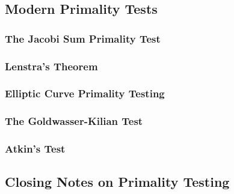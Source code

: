 \documentclass{article}
\begin{document}

\subsection{Modern Primality Tests}


\subsubsection{The Jacobi Sum Primality Test}

\subsubsection{Lenstra's Theorem}

\subsubsection{Elliptic Curve Primality Testing}

\subsubsection{The Goldwasser-Kilian Test}

\subsubsection{Atkin's Test}


\subsection{Closing Notes on Primality Testing}
\end{document}
